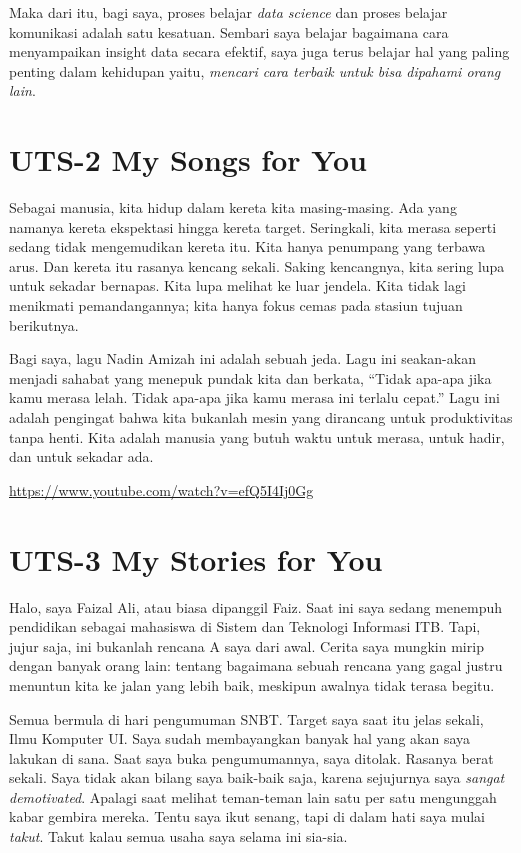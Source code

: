 \documentclass[
  letterpaper,
  DIV=11,
  numbers=noendperiod]{scrreprt}
\begin{document}
Maka dari itu, bagi saya, proses belajar \emph{data science} dan proses
belajar komunikasi adalah satu kesatuan. Sembari saya belajar bagaimana
cara menyampaikan insight data secara efektif, saya juga terus belajar
hal yang paling penting dalam kehidupan yaitu, \emph{mencari cara
terbaik untuk bisa dipahami orang lain}.


\chapter{UTS-2 My Songs for You}\label{uts-2-my-songs-for-you}

Sebagai manusia, kita hidup dalam kereta kita masing-masing. Ada yang
namanya kereta ekspektasi hingga kereta target. Seringkali, kita merasa
seperti sedang tidak mengemudikan kereta itu. Kita hanya penumpang yang
terbawa arus. Dan kereta itu rasanya kencang sekali. Saking kencangnya,
kita sering lupa untuk sekadar bernapas. Kita lupa melihat ke luar
jendela. Kita tidak lagi menikmati pemandangannya; kita hanya fokus
cemas pada stasiun tujuan berikutnya.

Bagi saya, lagu Nadin Amizah ini adalah sebuah jeda. Lagu ini
seakan-akan menjadi sahabat yang menepuk pundak kita dan berkata,
``Tidak apa-apa jika kamu merasa lelah. Tidak apa-apa jika kamu merasa
ini terlalu cepat.'' Lagu ini adalah pengingat bahwa kita bukanlah mesin
yang dirancang untuk produktivitas tanpa henti. Kita adalah manusia yang
butuh waktu untuk merasa, untuk hadir, dan untuk sekadar ada.

\url{https://www.youtube.com/watch?v=efQ5I4Ij0Gg}


\chapter{UTS-3 My Stories for You}\label{uts-3-my-stories-for-you}

Halo, saya Faizal Ali, atau biasa dipanggil Faiz. Saat ini saya sedang
menempuh pendidikan sebagai mahasiswa di Sistem dan Teknologi Informasi
ITB. Tapi, jujur saja, ini bukanlah rencana A saya dari awal. Cerita
saya mungkin mirip dengan banyak orang lain: tentang bagaimana sebuah
rencana yang gagal justru menuntun kita ke jalan yang lebih baik,
meskipun awalnya tidak terasa begitu.

Semua bermula di hari pengumuman SNBT. Target saya saat itu jelas
sekali, Ilmu Komputer UI. Saya sudah membayangkan banyak hal yang akan
saya lakukan di sana. Saat saya buka pengumumannya, saya ditolak.
Rasanya berat sekali. Saya tidak akan bilang saya baik-baik saja, karena
sejujurnya saya \emph{sangat demotivated}. Apalagi saat melihat
teman-teman lain satu per satu mengunggah kabar gembira mereka. Tentu
saya ikut senang, tapi di dalam hati saya mulai \emph{takut}. Takut
kalau semua usaha saya selama ini sia-sia.
\end{document}
